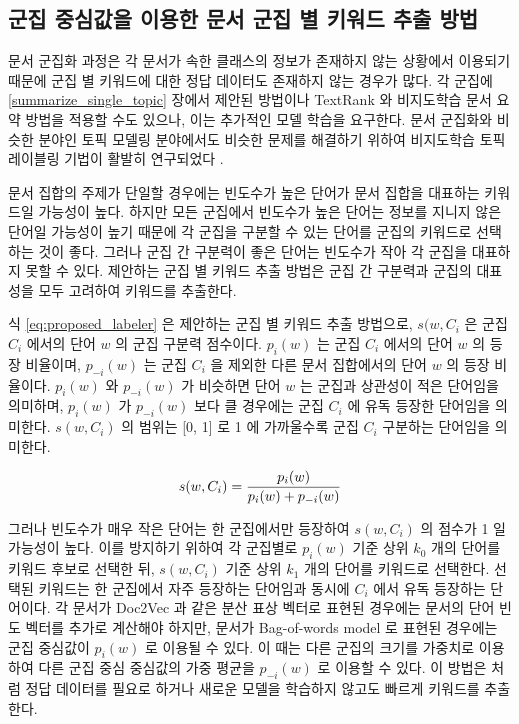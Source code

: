 \documentclass[oneside, ko,phd]{snuthesis_utf8_kor}
\begin{document}
\subsection{군집 중심값을 이용한 문서 군집 별 키워드 추출 방법}

문서 군집화 과정은 각 문서가 속한 클래스의 정보가 존재하지 않는 상황에서 이용되기 때문에 군집 별 키워드에 대한 정답 데이터도 존재하지 않는 경우가 많다.
각 군집에 \ref{summarize_single_topic} 장에서 제안된 방법이나 TextRank 와 비지도학습 문서 요약 방법을 적용할 수도 있으나, 이는 추가적인 모델 학습을 요구한다.
문서 군집화와 비슷한 분야인 토픽 모델링 분야에서도 비슷한 문제를 해결하기 위하여 비지도학습 토픽 레이블링 기법이 활발히 연구되었다 \cite{newman2010evaluating, sievert2014ldavis, chuang2012interpretation, snyder2013topic, chuang2012termite, blei2003latent}.

문서 집합의 주제가 단일할 경우에는 빈도수가 높은 단어가 문서 집합을 대표하는 키워드일 가능성이 높다.
하지만 모든 군집에서 빈도수가 높은 단어는 정보를 지니지 않은 단어일 가능성이 높기 때문에 각 군집을 구분할 수 있는 단어를 군집의 키워드로 선택하는 것이 좋다.
그러나 군집 간 구분력이 좋은 단어는 빈도수가 작아 각 군집을 대표하지 못할 수 있다.
제안하는 군집 별 키워드 추출 방법은 군집 간 구분력과 군집의 대표성을 모두 고려하여 키워드를 추출한다.

식 \ref{eq:proposed_labeler} 은 제안하는 군집 별 키워드 추출 방법으로, $s(w, C_i$ 은 군집 $C_i$ 에서의 단어 $w$ 의 군집 구분력 점수이다.
$p_i (w)$ 는 군집 $C_i$ 에서의 단어 $w$ 의 등장 비율이며, $p_{-i} (w)$ 는 군집 $C_i$ 을 제외한 다른 문서 집합에서의 단어 $w$ 의 등장 비율이다.
$p_i (w)$ 와 $p_{-i} (w)$ 가 비슷하면 단어 $w$ 는 군집과 상관성이 적은 단어임을 의미하며, $p_i (w)$ 가 $p_{-i} (w)$ 보다 클 경우에는 군집 $C_i$ 에 유독 등장한 단어임을 의미한다.
$s(w, C_i)$ 의 범위는 [0, 1] 로 1 에 가까울수록 군집 $C_i$ 구분하는 단어임을 의미한다.

\begin{equation}
\label{eq:proposed_labeler}
\centering
s(w, C_i) = \frac{p_i (w)}{p_i (w) + p_{-i}(w)}
\end{equation}

그러나 빈도수가 매우 작은 단어는 한 군집에서만 등장하여 $s(w, C_i)$ 의 점수가 1 일 가능성이 높다.
이를 방지하기 위하여 각 군집별로 $p_i (w)$ 기준 상위 $k_0$ 개의 단어를 키워드 후보로 선택한 뒤, $s(w, C_i)$ 기준 상위 $k_1$ 개의 단어를 키워드로 선택한다.
선택된 키워드는 한 군집에서 자주 등장하는 단어임과 동시에 $C_i$ 에서 유독 등장하는 단어이다.
각 문서가 Doc2Vec 과 같은 분산 표상 벡터로 표현된 경우에는 문서의 단어 빈도 벡터를 추가로 계산해야 하지만, 문서가 Bag-of-words model 로 표현된 경우에는 군집 중심값이 $p_i (w)$ 로 이용될 수 있다.
이 때는 다른 군집의 크기를 가중치로 이용하여 다른 군집 중심 중심값의 가중 평균을 $p_{-i}(w)$ 로 이용할 수 있다.
이 방법은 \cite{zhang2006keyword, onan2016ensemble} 처럼 정답 데이터를 필요로 하거나 새로운 모델을 학습하지 않고도 빠르게 키워드를 추출한다.
\end{document}
